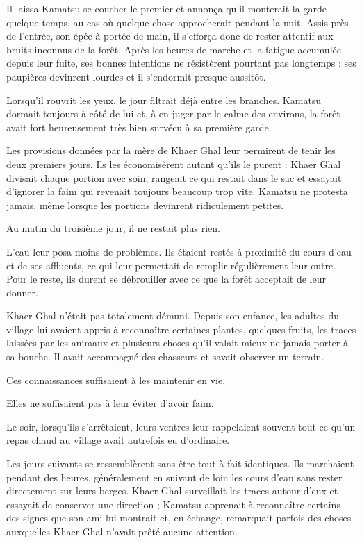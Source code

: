Il laissa Kamatsu se coucher le premier et annonça qu'il monterait la garde
quelque temps, au cas où quelque chose approcherait pendant la nuit. Assis près
de l'entrée, son épée à portée de main, il s'efforça donc de rester attentif
aux bruits inconnus de la forêt. Après les heures de marche et la fatigue
accumulée depuis leur fuite, ses bonnes intentions ne résistèrent pourtant pas
longtemps : ses paupières devinrent lourdes et il s'endormit presque aussitôt.

Lorsqu'il rouvrit les yeux, le jour filtrait déjà entre les branches. Kamatsu
dormait toujours à côté de lui et, à en juger par le calme des environs, la
forêt avait fort heureusement très bien survécu à sa première garde.

\scenebreak

Les provisions données par la mère de Khaer Ghal leur permirent de tenir les
deux premiers jours. Ils les économisèrent autant qu'ils le purent : Khaer Ghal
divisait chaque portion avec soin, rangeait ce qui restait dans le sac et
essayait d'ignorer la faim qui revenait toujours beaucoup trop vite. Kamatsu
ne protesta jamais, même lorsque les portions devinrent ridiculement petites.

Au matin du troisième jour, il ne restait plus rien.

L'eau leur posa moins de problèmes. Ils étaient restés à proximité du cours
d'eau et de ses affluents, ce qui leur permettait de remplir régulièrement leur
outre. Pour le reste, ils durent se débrouiller avec ce que la forêt acceptait
de leur donner.

Khaer Ghal n'était pas totalement démuni. Depuis son enfance, les adultes du
village lui avaient appris à reconnaître certaines plantes, quelques fruits,
les traces laissées par les animaux et plusieurs choses qu'il valait mieux ne
jamais porter à sa bouche. Il avait accompagné des chasseurs et savait observer
un terrain.

Ces connaissances suffisaient à les maintenir en vie.

Elles ne suffisaient pas à leur éviter d'avoir faim.

Le soir, lorsqu'ils s'arrêtaient, leurs ventres leur rappelaient souvent tout
ce qu'un repas chaud au village avait autrefois eu d'ordinaire.

\scenebreak

Les jours suivants se ressemblèrent sans être tout à fait identiques. Ils
marchaient pendant des heures, généralement en suivant de loin les cours d'eau
sans rester directement sur leurs berges. Khaer Ghal surveillait les traces
autour d'eux et essayait de conserver une direction ; Kamatsu apprenait à
reconnaître certains des signes que son ami lui montrait et, en échange,
remarquait parfois des choses auxquelles Khaer Ghal n'avait prêté aucune
attention.

